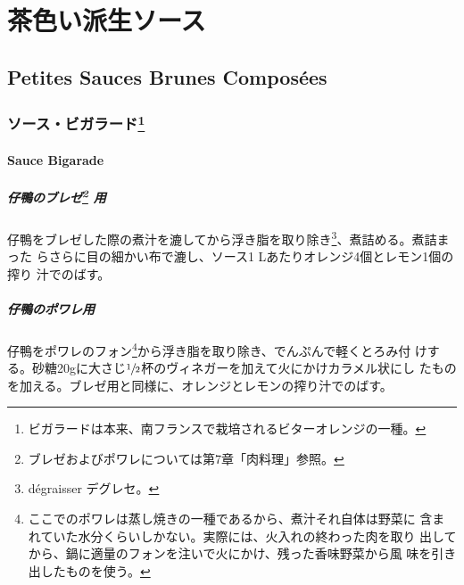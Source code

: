 \hypertarget{ux8336ux8272ux3044ux6d3eux751fux30bdux30fcux30b9}{%
\section{茶色い派生ソース}\label{ux8336ux8272ux3044ux6d3eux751fux30bdux30fcux30b9}}

\hypertarget{petites-sauces-brunes-composuxe9es}{%
\subsection{Petites Sauces Brunes
Composées}\label{petites-sauces-brunes-composuxe9es}}

\maeaki

\hypertarget{ux30bdux30fcux30b9ux30d3ux30acux30e9ux30fcux30c91}{%
\subsubsection[ソース・ビガラード]{\texorpdfstring{ソース・ビガラード\footnote{ビガラードは本来、南フランスで栽培されるビターオレンジの一種。}}{ソース・ビガラード}}\label{ux30bdux30fcux30b9ux30d3ux30acux30e9ux30fcux30c91}}

\hypertarget{sauce-bigarade}{%
\paragraph{Sauce Bigarade}\label{sauce-bigarade}}


\hypertarget{ux4ed4ux9d28ux306eux30d6ux30ecux30bc2-ux7528}{%
\subparagraph[仔鴨のブレゼ 用]{\texorpdfstring{仔鴨のブレゼ\footnote{ブレゼおよびポワレについては第7章「肉料理」参照。}
用}{仔鴨のブレゼ 用}}\label{ux4ed4ux9d28ux306eux30d6ux30ecux30bc2-ux7528}}

仔鴨をブレゼした際の煮汁を漉してから浮き脂を取り除き\footnote{dégraisser
  デグレセ。}、煮詰める。煮詰まった らさらに目の細かい布で漉し、ソース1
Lあたりオレンジ4個とレモン1個の搾り 汁でのばす。

\hypertarget{ux4ed4ux9d28ux306eux30ddux30efux30ecux7528}{%
\subparagraph{仔鴨のポワレ用}\label{ux4ed4ux9d28ux306eux30ddux30efux30ecux7528}}

仔鴨をポワレのフォン\footnote{ここでのポワレは蒸し焼きの一種であるから、煮汁それ自体は野菜に
  含まれていた水分くらいしかない。実際には、火入れの終わった肉を取り
  出してから、鍋に適量のフォンを注いで火にかけ、残った香味野菜から風
  味を引き出したものを使う。}から浮き脂を取り除き、でんぷんで軽くとろみ付
けする。砂糖20gに大さじ\(\sfrac{1}{2}\)杯のヴィネガーを加えて火にかけカラメル状にし
たものを加える。ブレゼ用と同様に、オレンジとレモンの搾り汁でのばす。

